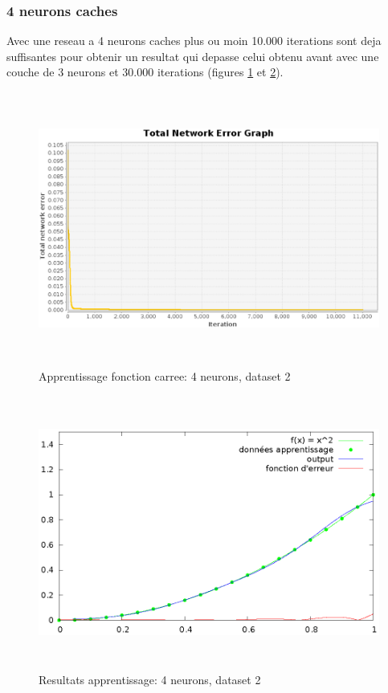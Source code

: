 \documentclass[twoside,openright,a4paper,11pt,french]{article}
\begin{document}
\subsubsection{4 neurons caches}

Avec une reseau a 4 neurons caches plus ou moin 10.000 iterations
sont deja suffisantes pour obtenir un resultat qui depasse celui obtenu
avant avec une couche de 3 neurons et 30.000 iterations 
(figures \ref{fig:sqtest4} et \ref{fig:chartsqtest4}).


\begin{figure}[h]
\centering
\includegraphics[width=12cm,height=9cm]{./pics/sqtest4.eps}
\caption{Apprentissage fonction carree: 4 neurons, dataset 2}
\label{fig:sqtest4}
\end{figure}

\begin{figure}[h]
\centering
\includegraphics[width=12cm,height=9cm]{./pics/chartsqtest4.eps}
\caption{Resultats apprentissage: 4 neurons, dataset 2}
\label{fig:chartsqtest4}
\end{figure}
\end{document}

